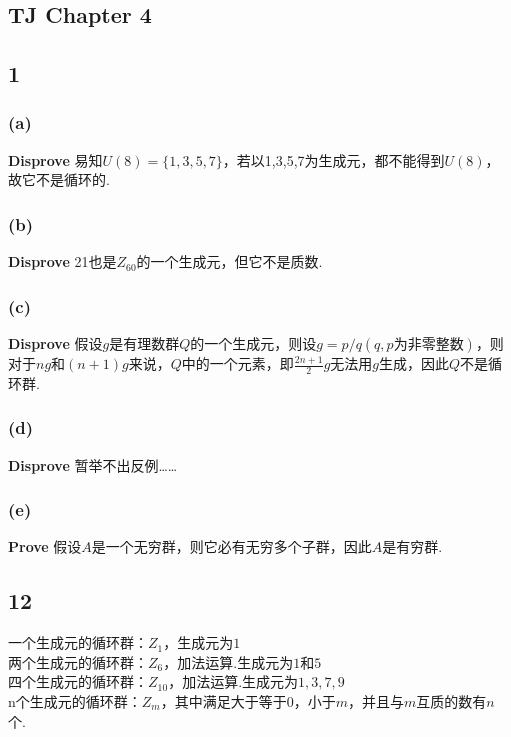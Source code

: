 \documentclass[twocolumn]{article}
\newenvironment{SChinese}{
	\CJKfamily{gbsn}
	\CJKtilde
	\CJKnospace}{}
\begin{document}
\begin{CJK}{UTF8}{}
\begin{SChinese}
			\section*{TJ Chapter 4}
				\subsection*{1}
					\subsubsection*{(a)}
						\textbf{Disprove}
						易知$U(8)=\{1,3,5,7\}$，若以1,3,5,7为生成元，都不能得到$U(8)$，故它不是循环的.
					\subsubsection*{(b)}
						\textbf{Disprove}
						21也是$Z_{60}$的一个生成元，但它不是质数.
					\subsubsection*{(c)}
						\textbf{Disprove}
						假设$g$是有理数群$Q$的一个生成元，则设$g=p/q(q,p\textrm{为非零整数})$，则对于$ng$和$(n+1)g$来说，$Q$中的一个元素，即$\frac{2n+1}{2}g$无法用$g$生成，因此$Q$不是循环群.
					\subsubsection*{(d)}
						\textbf{Disprove}
						暂举不出反例……
					\subsubsection*{(e)}
						\textbf{Prove}
						假设$A$是一个无穷群，则它必有无穷多个子群，因此$A$是有穷群.
				\subsection*{12}
					一个生成元的循环群：$Z_1$，生成元为$1$ \\
					两个生成元的循环群：$Z_6$，加法运算.生成元为$1$和$5$ \\
					四个生成元的循环群：$Z_10$，加法运算.生成元为$1,3,7,9$ \\
					n个生成元的循环群：$Z_m$，其中满足大于等于0，小于$m$，并且与$m$互质的数有$n$个.

\end{SChinese}
\end{CJK}
\end{document}
